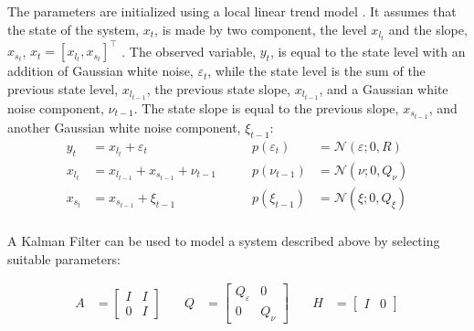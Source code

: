 \documentclass{article}
\newcommand{\norm}[3]{\mathcal{N}\left(#1; #2, #3\right)} %
\begin{document}
The parameters are initialized using a local linear trend model \cite{durbin_time_2012-1}. It assumes that the state of the system, $x_t$, is made by two component, the level $x_{l_t}$ and the slope, $x_{s_t}$, $x_t = [x_{l_t}, x_{s_t}]^\top$ . The observed variable, $y_t$, is equal to the state level with an addition of Gaussian white noise, $\varepsilon_t$, while the state level is the sum of the previous state level, $x_{l_{t-1}}$, the previous state slope, $x_{l_{t-1}}$, and a Gaussian white noise component, $\nu_{t-1}$. The state slope is equal to the previous slope, $x_{s_{t-1}}$, and another Gaussian white noise component, $\xi_{t-1}$:
\begin{equation*}
   \begin{alignedat}{2}
    y_t &= x_{l_t} + \varepsilon_t & p(\varepsilon_t) \quad &= \norm{\varepsilon}{0}{R}\\
    x_{l_t} &= x_{l_{t-1}} + x_{s_{t-1}} + \nu_{t-1} \quad \quad & p(\nu_{t-1}) &= \norm{\nu}{0}{Q_\nu}\\
    x_{s_t} &= x_{s_{t-1}} + \xi_{t-1} \quad & p(\xi_{t-1}) &= \norm{\xi}{0}{Q_\xi} \\
    \end{alignedat} 
\end{equation*}

A Kalman Filter can be used to model a system described above by selecting suitable parameters:

\begin{equation*}\label{eq:local_slope}
\begin{alignedat}{3}
    A &= \begin{bmatrix}I & I \\ 0 & I\end{bmatrix} \quad & Q &= \begin{bmatrix}Q_\varepsilon & 0 \\ 0 & Q_\nu \end{bmatrix}  \quad & H &= \begin{bmatrix}I & 0 \end{bmatrix}
\end{alignedat} 
\end{equation*}
\end{document}
